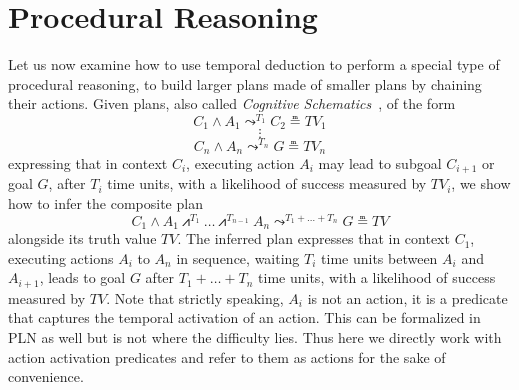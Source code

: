\documentclass[runningheads]{llncs}
\newcommand{\TImpl}{\textit{Implication}}
\newcommand{\TPredImpl}{\textit{PredictiveImplication}}
\newcommand{\TLead}{\textit{Lead}}
\newcommand{\TTV}{\textit{TV}}
\newcommand{\TTVo}{\textit{TV}_1}
\newcommand{\TTVi}{\textit{TV}_i}
\newcommand{\TTVn}{\textit{TV}_n}
\newcommand{\lpreimp}[1]{\leadsto^{#1}}
\newcommand{\lseqand}[1]{\bigslopedwedge^{#1}}
\newcommand{\ldo}[1]{\widehat{#1}}
\begin{document}
\section{Procedural Reasoning}
\label{sec:procedural}
Let us now examine how to use temporal deduction to perform a special
type of procedural reasoning, to build larger plans made of smaller
plans by chaining their actions.  Given plans, also called
\emph{Cognitive Schematics}~\cite{Goertzel2011CSP}, of the form
$$C_1 \land A_1 \lpreimp{T_1} C_2 \measeq \TTVo$$
$$\vdots$$
$$C_n \land A_n \lpreimp{T_n} G \measeq \TTVn$$
expressing that in context $C_i$, executing action $A_i$ may lead to
subgoal $C_{i+1}$ or goal $G$, after $T_i$ time units, with a
likelihood of success measured by $\TTVi$, we show how to infer the
composite plan
$$C_1 \land A_1 \lseqand{T_1} \dots \lseqand{T_{n-1}} A_n
\lpreimp{T_1+\dots+T_n} G \measeq \TTV$$ alongside its truth value
$\TTV$.  The inferred plan expresses that in context $C_1$, executing
actions $A_i$ to $A_n$ in sequence, waiting $T_i$ time units between
$A_i$ and $A_{i+1}$, leads to goal $G$ after $T_1+\dots+T_n$ time
units, with a likelihood of success measured by $\TTV$.  Note that
strictly speaking, $A_i$ is not an action, it is a predicate that
captures the temporal activation of an action.  This can be formalized
in PLN as well but is not where the difficulty lies.  Thus here we
directly work with action activation predicates and refer to them as
actions for the sake of convenience.



\end{document}
